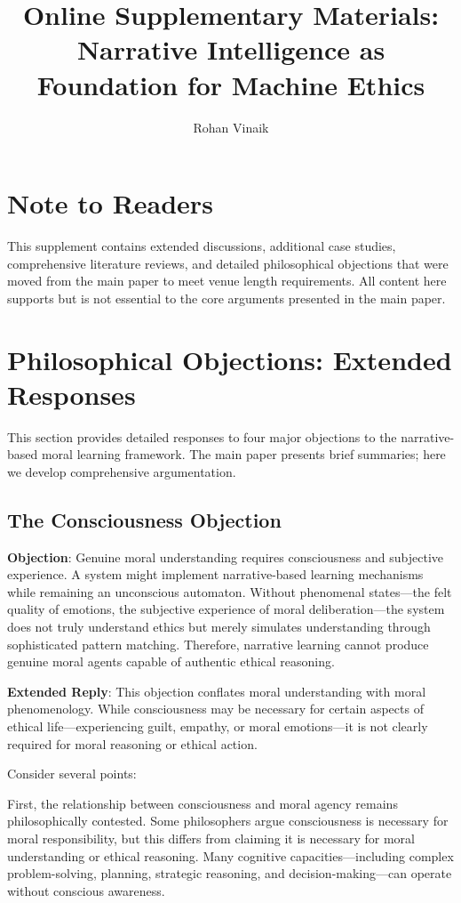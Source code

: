 \documentclass[12pt]{article}
\title{Online Supplementary Materials:\\
Narrative Intelligence as Foundation for Machine Ethics}
\author{Rohan Vinaik}
\date{}
\begin{document}
\maketitle

\section*{Note to Readers}
This supplement contains extended discussions, additional case studies, comprehensive literature reviews, and detailed philosophical objections that were moved from the main paper to meet venue length requirements. All content here supports but is not essential to the core arguments presented in the main paper.

\section{Philosophical Objections: Extended Responses}

This section provides detailed responses to four major objections to the narrative-based moral learning framework. The main paper presents brief summaries; here we develop comprehensive argumentation.

\subsection{The Consciousness Objection}

\textbf{Objection}: Genuine moral understanding requires consciousness and subjective experience. A system might implement narrative-based learning mechanisms while remaining an unconscious automaton. Without phenomenal states---the felt quality of emotions, the subjective experience of moral deliberation---the system does not truly understand ethics but merely simulates understanding through sophisticated pattern matching. Therefore, narrative learning cannot produce genuine moral agents capable of authentic ethical reasoning.

\textbf{Extended Reply}: This objection conflates moral understanding with moral phenomenology. While consciousness may be necessary for certain aspects of ethical life---experiencing guilt, empathy, or moral emotions---it is not clearly required for moral reasoning or ethical action.

Consider several points:

First, the relationship between consciousness and moral agency remains philosophically contested. Some philosophers argue consciousness is necessary for moral responsibility, but this differs from claiming it is necessary for moral understanding or ethical reasoning. Many cognitive capacities---including complex problem-solving, planning, strategic reasoning, and decision-making---can operate without conscious awareness.
\end{document}
